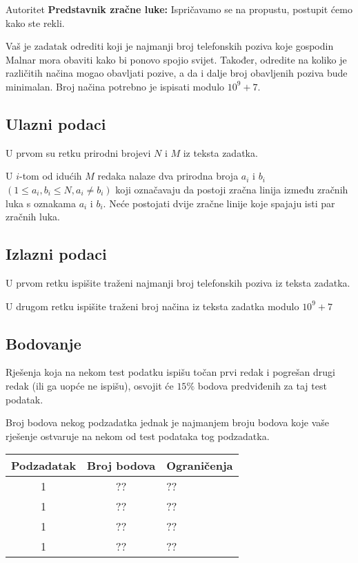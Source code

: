 \begin{statement}[
  problempoints=100,
  timelimit=1 sekunda,
  memorylimit=512 MiB,
]{Autoritet}
\textbf{Predstavnik zračne luke:} Ispričavamo se na propustu, postupit ćemo
  kako ste rekli.

Vaš je zadatak odrediti koji je najmanji broj telefonskih poziva koje gospodin
Malnar mora obaviti kako bi ponovo spojio svijet. Također, odredite na koliko
je različitih načina mogao obavljati pozive, a da i dalje broj obavljenih poziva
bude minimalan. Broj načina potrebno je ispisati modulo $10^9 + 7$.

\subsection*{Ulazni podaci}
U prvom su retku prirodni brojevi $N$ i $M$ iz teksta zadatka.

U $i$-tom od idućih $M$ redaka nalaze dva prirodna broja $a_i$ i $b_i$ $(1 \le
a_i, b_i \le N, a_i \ne b_i)$ koji označavaju da postoji zračna linija između
zračnih luka s oznakama $a_i$ i $b_i$. Neće postojati dvije zračne linije
koje spajaju isti par zračnih luka.

\subsection*{Izlazni podaci}
U prvom retku ispišite traženi najmanji broj telefonskih poziva iz teksta
zadatka.

U drugom retku ispišite traženi broj načina iz teksta zadatka modulo $10^9 + 7$

\clearpage
\subsection*{Bodovanje}
Rješenja koja na nekom test podatku ispišu točan prvi redak i pogrešan drugi
redak (ili ga uopće ne ispišu), osvojit će $15\%$ bodova predviđenih za taj
test podatak.

Broj bodova nekog podzadatka jednak je najmanjem broju bodova koje vaše rješenje
ostvaruje na nekom od test podataka tog podzadatka.

{\renewcommand{\arraystretch}{1.4}
  \setlength{\tabcolsep}{6pt}
  \begin{tabular}{ccl}
 Podzadatak & Broj bodova & Ograničenja \\ \midrule
  1 & ?? & ?? \\
  1 & ?? & ?? \\
  1 & ?? & ?? \\
  1 & ?? & ?? \\


\end{tabular}}
\end{statement}
